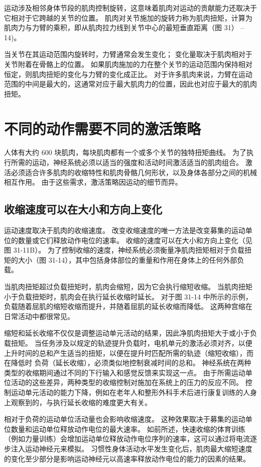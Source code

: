 运动涉及相邻身体节段的肌肉控制旋转，这意味着肌肉对运动的贡献能力还取决于它相对于它跨越的关节的位置。 肌肉对关节施加的旋转力称为肌肉扭矩，计算为肌肉力与力臂的乘积，即从肌肉拉力线到关节中心的最短垂直距离（图 31） –14)。

当关节在其运动范围内旋转时，力臂通常会发生变化； 变化量取决于肌肉相对于关节附着在骨骼上的位置。 如果肌肉施加的力在整个关节的运动范围内保持相对恒定，则肌肉扭矩的变化与力臂的变化成正比。 对于许多肌肉来说，力臂在运动范围的中间是最大的，这通常对应于最大肌肉力的位置，因此也对应于最大的肌肉扭矩。


\section{不同的动作需要不同的激活策略}
人体有大约 600 块肌肉，每块肌肉都有一个或多个关节的独特扭矩曲线。 为了执行所需的运动，神经系统必须以适当的强度和活动时间激活适当的肌肉组合。 激活必须适合许多肌肉的收缩特性和肌肉骨骼几何形状，以及身体各部分之间的机械相互作用。 由于这些需求，激活策略因运动的细节而异。

\subsection{收缩速度可以在大小和方向上变化}
运动速度取决于肌肉的收缩速度。 改变收缩速度的唯一方法是改变募集的运动单位的数量或它们释放动作电位的速率。 收缩的速度可以在大小和方向上变化（见图 31-11B）。 为了控制收缩的速度，神经系统必须衡量净肌肉扭矩相对于负载扭矩的大小（图 31-14），其中包括身体部位的重量和作用在身体上的任何外部负载。

当肌肉扭矩超过负载扭矩时，肌肉会缩短，因为它会执行缩短收缩。 当肌肉扭矩小于负载扭矩时，肌肉会在执行延长收缩时延长。 对于图 31-14 中所示的示例，负载随着屈肌的缩短收缩而提升，并随着屈肌的延长收缩而降低。 这两种宫缩在日常活动中都很常见。

缩短和延长收缩不仅仅是调整运动单元活动的结果，因此净肌肉扭矩大于或小于负载扭矩。 当任务涉及以规定的轨迹提升负载时，电机单元的激活必须对齐，以便上升时间的总和产生适当的扭矩，以便在提升时匹配所需的轨迹（缩短收缩），而在降低时 负荷（延长收缩），必须类似地控制衰减时间的总和。 神经系统在两种类型的收缩期间通过不同的下行输入和感觉反馈来实现这一点。 由于所需运动单位活动的这些差异，两种类型的收缩控制对施加在系统上的压力的反应不同。 控制运动单元活动的能力下降，例如在老年人和整形外科手术后进行康复训练的人身上观察到的，与执行延长收缩的难度更大有关。

相对于负荷的运动单位活动量也会影响收缩速度。 这种效果取决于募集的运动单位数量和运动单位释放动作电位的最大速率。 如前所述，快速收缩的体育训练（例如力量训练）会增加运动单位释放动作电位序列的速率，这可以通过将电流逐步注入运动神经元来模拟。 习惯性身体活动水平发生变化后，肌肉最大缩短速度的变化至少部分是影响运动神经元以高速率释放动作电位的能力的因素的结果。

